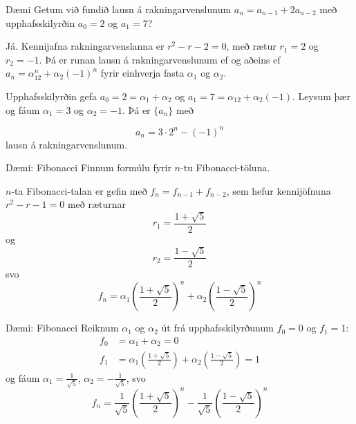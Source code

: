 \documentclass[handout]{beamer}
\begin{document}
\begin{frame}{Dæmi}
Getum við fundið lausn á rakningarvenslunum $a_n = a_{n-1} + 2a_{n-2}$ með upphafsskilyrðin $a_0 = 2$ og $a_1 = 7$? \pause

\vspace{0.5cm}
Já. Kennijafna rakningarvenslanna er $r^2 - r - 2 = 0$, með rætur $r_1 = 2$ og $r_2 = -1$. Þá er runan lausn á rakningarvenslunum ef og aðeins ef $a_n = \alpha_12^n + \alpha_2(-1)^n$ fyrir einhverja fasta $\alpha_1$ og $\alpha_2$.\pause

Upphafsskilyrðin gefa $a_0 = 2 = \alpha_1 + \alpha_2$ og $a_1 = 7 = \alpha_12 + \alpha_2(-1)$. Leysum þær og fáum $\alpha_1 = 3$ og $\alpha_2 = -1$. Þá er $\{a_n\}$ með

\[
 a_n = 3 \cdot 2^n - (-1)^n
\]
lausn á rakningarvenslunum.

\end{frame}

\begin{frame}{Dæmi: Fibonacci}
Finnum formúlu fyrir $n$-tu Fibonacci-töluna. \pause

$n$-ta Fibonacci-talan er gefin með $f_n = f_{n-1} + f_{n-2}$, sem hefur kennijöfnuna $r^2 - r - 1 = 0$ með ræturnar 
\[r_1 = \frac{1 + \sqrt{5}}{2} \]
og
\[r_2 = \frac{1 - \sqrt{5}}{2}\]
svo
\[
 f_n = \alpha_1\left(\frac{1 + \sqrt{5}}{2}\right)^n + \alpha_2\left(\frac{1 - \sqrt{5}}{2}\right)^n
\]
\end{frame}

\begin{frame}{Dæmi: Fibonacci}
Reiknum $\alpha_1$ og $\alpha_2$ út frá upphafsskilyrðunum $f_0 = 0$ og $f_1 = 1$:
\begin{align*}
f_0 &= \alpha_1 + \alpha_2 = 0\\
f_1 &= \alpha_1\left(\frac{1 + \sqrt{5}}{2}\right) + \alpha_2\left(\frac{1 - \sqrt{5}}{2}\right) = 1
\end{align*}
og fáum $\alpha_1 = \frac{1}{\sqrt{5}}$, $\alpha_2 = -\frac{1}{\sqrt{5}}$, svo
\[
 f_n = \frac{1}{\sqrt{5}}\left(\frac{1 + \sqrt{5}}{2}\right)^n -\frac{1}{\sqrt{5}}\left(\frac{1 - \sqrt{5}}{2}\right)^n
\]
\end{frame}
\end{document}

